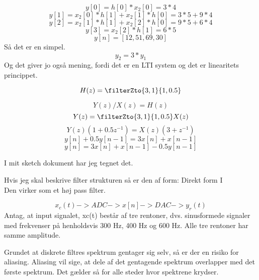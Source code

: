 \begin{rubrik}[Eksamenssæt 2021]
\begin{eksamensOpgave}
\begin{UnderOpgave}[Et andet signal er givet ved \text{$x_2[n] = 3x[n]$}]
            \[y[0] = h[0] * x_2[0] = 3*4\]
            \[y[1] = x_2[0] * h[1] + x_2[1]*h[0] = 3 * 5 + 9 * 4\]
            \[y[2] = x_2[1] * h[1] + x_2[2] * h[0] = 9 * 5 + 6 * 4\]
            \[y[3] = x_2[2] * h[1] = 6 * 5\]
            \[y[n] = [12, 51, 69, 30]\]
            Så det er en simpel.
            \[y_2 = 3 * y_1\]
            Og det giver jo også mening, fordi det er en LTI system og det er linearitets princippet.            
        \end{UnderOpgave}
    \end{eksamensOpgave}
    \begin{eksamensOpgave}
        \[H(z) = \filterZto{3, 1}{1, 0.5}\]
        \begin{UnderOpgave}
            \[Y(z)/X(z) = H(z)\]
            \[Y(z) = \filterZto{3, 1}{1, 0.5} X(z)\]
            \[Y(z)(1 + 0.5z^{-1}) = X(z)(3 + z^{-1})\]
            \[y[n] + 0.5y[n - 1] = 3x[n] + x[n - 1]\]
            \[y[n] = 3x[n] + x[n - 1] - 0.5y[n - 1]\]
        \end{UnderOpgave}
        \begin{UnderOpgave}
            I mit sketch dokument har jeg tegnet det. 
        \end{UnderOpgave}
        \begin{UnderOpgave}
            Hvis jeg skal beskrive filter strukturen så er den af form: 
            Direkt form I
            \\
            Den virker som et høj pass filter.
        \end{UnderOpgave}
    \end{eksamensOpgave}
    \begin{eksamensOpgave}
        \[x_c(t) -> ADC -> x[n] -> DAC -> y_r(t)\]
        Antag, at input signalet, xc(t) består af tre rentoner, dvs. sinusformede signaler med frekvenser på henholdsvis 300 Hz, 400 Hz og 600 Hz. Alle tre rentoner har samme amplitude.
        \begin{UnderOpgave}
            Grundet at diskrete filtres spektrum gentager sig selv, så er der en risiko for aliasing. 
            Aliasing vil sige, at dele af det gentagende spektrum overlapper med det første spektrum. Det gælder så for alle steder hvor spektrene krydser. 

\end{UnderOpgave}
\end{eksamensOpgave}
\end{rubrik}
